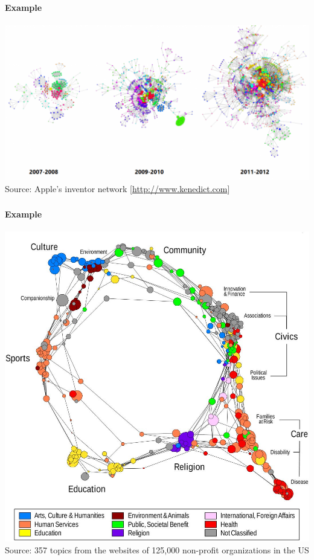 \documentclass[8pt]{beamer}
\begin{document}



\begin{frame}
\frametitle{\insertsection}
\framesubtitle{Example}
\centering
\includegraphics[width=\linewidth,height=0.8\textheight,keepaspectratio]{apple}\\
\tiny Source: Apple's inventor network [\url{http://www.kenedict.com}]
\end{frame}



\begin{frame}
\frametitle{\insertsection}
\framesubtitle{Example}
\centering
\includegraphics[width=\linewidth,height=0.8\textheight,keepaspectratio]{altruism}\\
\tiny Source: 357 topics from the websites of 125,000 non-profit organizations in the US \cite{Klavans2014}
\end{frame}
\end{document}
